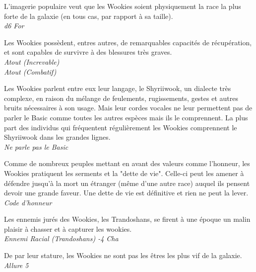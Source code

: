 \begin{description}[align=left]
	\item [Force de la nature] 				%
		L’imagerie populaire veut que les Wookies soient physiquement la race la plus forte de la galaxie (en tous cas, par rapport à sa taille).\\
		\textit{d6 For}

	\item [Increvable] 						%
		Les Wookies possèdent, entres autres, de remarquables capacités de récupération, et sont capables de survivre à des blessures très graves.\\
		\textit{Atout (Increvable)}\\
		\textit{Atout (Combatif)}

	\item [Shyriiwook] 						%
		Les Wookies parlent entre eux leur langage, le Shyriiwook, un dialecte très complexe, en raison du mélange de feulements, rugissements, gestes et autres bruits nécessaires à son usage. Mais leur cordes vocales ne leur permettent pas de parler le Basic comme toutes les autres espèces mais ils le comprennent. La plus part des individus qui fréquentent régulièrement les Wookies comprennent le Shyriiwook dans les grandes lignes.\\
		\textit{Ne parle pas le Basic}

	\item [Force \& Honneur] 				%
		Comme de nombreux peuples mettant en avant des valeurs comme l’honneur, les Wookies pratiquent les serments et la "dette de vie". Celle-ci peut les amener à défendre jusqu’à la mort un étranger (même d’une autre race) auquel ils pensent devoir une grande faveur. Une dette de vie est définitive et rien ne peut la lever.\\
		\textit{Code d’honneur}

	\item [Ennemis jurés] 					%
		Les ennemis jurés des Wookies, les Trandoshans, se firent à une époque un malin plaisir à chasser et à capturer les wookies.\\
		\textit{Ennemi Racial (Trandoshans) -4 Cha}

	\item [Il faut partir à point] 			%
		De par leur stature, les Wookies ne sont pas les êtres les plus vif de la galaxie.\\
		\textit{Allure 5}
\end{description}